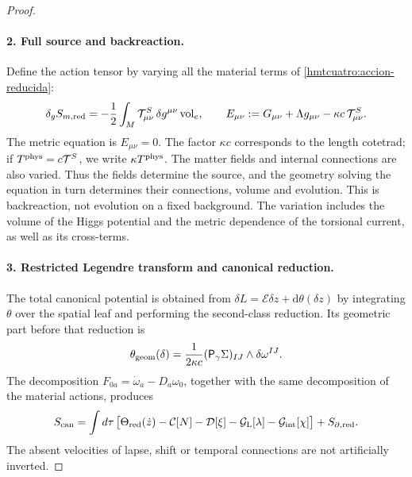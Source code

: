 \begin{proof}
\paragraph{2. Full source and backreaction.}
Define the action tensor by varying all the material terms of \eqref{hmtcuatro:accion-reducida}:
\begin{equation}
 \delta_g S_{m,\rm red}=-\frac12\int_M
       \mathcal T^S_{\mu\nu}\,\delta g^{\mu\nu}\operatorname{vol}_e,
 \qquad
 E_{\mu\nu}:=G_{\mu\nu}+\Lambda g_{\mu\nu}
                   -\kappa c\,\mathcal T^S_{\mu\nu}.
 \label{hmtcuatro:fuente-completa}
\end{equation}
The metric equation is \(E_{\mu\nu}=0\). The factor \(\kappa c\) corresponds to the length cotetrad; if \(T^{\rm phys}=c\mathcal T^S\), we write \(\kappa T^{\rm phys}\). The matter fields and internal connections are also varied. Thus the fields determine the source, and the geometry solving the equation in turn determines their connections, volume and evolution. This is backreaction, not evolution on a fixed background. The variation includes the volume of the Higgs potential and the metric dependence of the torsional current, as well as its cross-terms.

\paragraph{3. Restricted Legendre transform and canonical reduction.}
The total canonical potential is obtained from \(\delta L=\mathcal E\delta z+\mathrm d\theta(\delta z)\) by integrating \(\theta\) over the spatial leaf and performing the second-class reduction. Its geometric part before that reduction is
\[
 \theta_{\rm geom}(\delta)=
   \frac1{2\kappa c}(\mathsf P_\gamma\Sigma)_{IJ}
                       \wedge\delta\omega^{IJ}.
\]
The decomposition \(F_{0a}=\dot\omega_a-D_a\omega_0\), together with the same decomposition of the material actions, produces
\begin{equation}
 S_{\rm can}=\int d\tau\,
 \bigl[\Theta_{\rm red}(\dot z)-\mathcal C[N]-\mathcal D[\xi]
       -\mathcal G_{\rm L}[\lambda]-\mathcal G_{\rm int}[\chi]\bigr]
       +S_{\partial,\rm red}.
 \label{hmtcuatro:legendre-total}
\end{equation}
The absent velocities of lapse, shift or temporal connections are not artificially inverted.


\end{proof}
